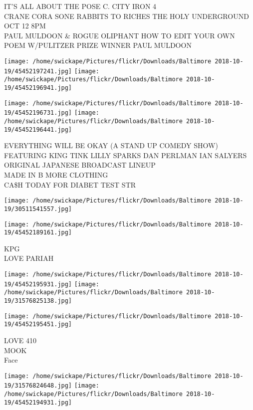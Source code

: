 \documentclass[10pt,letterpaper]{article}
\begin{document}
IT'S ALL ABOUT THE POSE C. CITY IRON 4\\
CRANE CORA SONE RABBITS TO RICHES THE HOLY UNDERGROUND OCT 12 8PM\\
PAUL MULDOON \& ROGUE OLIPHANT HOW TO EDIT YOUR OWN POEM W/PULITZER PRIZE WINNER PAUL MULDOON
\pagebreak

\texttt{[image: /home/swickape/Pictures/flickr/Downloads/Baltimore 2018-10-19/45452197241.jpg]}
\texttt{[image: /home/swickape/Pictures/flickr/Downloads/Baltimore 2018-10-19/45452196941.jpg]}

\texttt{[image: /home/swickape/Pictures/flickr/Downloads/Baltimore 2018-10-19/45452196731.jpg]}
\texttt{[image: /home/swickape/Pictures/flickr/Downloads/Baltimore 2018-10-19/45452196441.jpg]}

EVERYTHING WILL BE OKAY (A STAND UP COMEDY SHOW) FEATURING KING TINK LILLY SPARKS DAN PERLMAN IAN SALYERS\\
ORIGINAL JAPANESE BROADCAST LINEUP\\
MADE IN B MORE CLOTHING\\
CA\$H TODAY FOR DIABET TEST STR
\pagebreak

\texttt{[image: /home/swickape/Pictures/flickr/Downloads/Baltimore 2018-10-19/30511541557.jpg]}

\vspace{0.25in}
\texttt{[image: /home/swickape/Pictures/flickr/Downloads/Baltimore 2018-10-19/45452189161.jpg]}

KPG\\
LOVE PARIAH
\pagebreak

\texttt{[image: /home/swickape/Pictures/flickr/Downloads/Baltimore 2018-10-19/45452195931.jpg]}
\texttt{[image: /home/swickape/Pictures/flickr/Downloads/Baltimore 2018-10-19/31576825138.jpg]}

\vspace{0.25in}
\texttt{[image: /home/swickape/Pictures/flickr/Downloads/Baltimore 2018-10-19/45452195451.jpg]}

LOVE 410\\
MOOK\\
Face
\pagebreak

\texttt{[image: /home/swickape/Pictures/flickr/Downloads/Baltimore 2018-10-19/31576824648.jpg]}
\texttt{[image: /home/swickape/Pictures/flickr/Downloads/Baltimore 2018-10-19/45452194931.jpg]}
\end{document}
